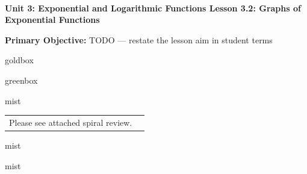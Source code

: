 \documentclass[10pt]{article}
\newcommand{\UnitNumberName}{Unit 3: Exponential and Logarithmic Functions \quad}
\newcommand{\LessonNumberName}{Lesson 3.2: Graphs of Exponential Functions}
\begin{document}
\begin{center}
    {\Large\bfseries \CourseName \\
    {\small\bfseries \UnitNumberName \LessonNumberName}}
\end{center}

\begin{tcolorbox}[colback=mist, colframe=royal, boxrule=0.9pt, arc=2mm,
    left=2mm, right=2mm, top=1.5mm, bottom=1.5mm]
    \textbf{Primary Objective:} TODO --- restate the lesson aim in student terms
\end{tcolorbox}

\renewcommand{\arraystretch}{1.6}
\begin{skillbox}{goldbox}
\end{skillbox}

\begin{skillbox}{greenbox}
\end{skillbox}

\begin{fixedskillbox}{mist}
    \begin{tabularx}{\linewidth}{@{}X c@{}}
        \begin{minipage}[t]{0.55\linewidth}\vspace{0pt}
            Please see attached spiral review.  %
        \end{minipage}
        &
        \begin{minipage}[t]{0.38\linewidth}\vspace{0pt}\centering
        \end{minipage}
    \end{tabularx}
\end{fixedskillbox}

\begin{skillbox}[Hook]{mist}
\end{skillbox}

\begin{skillbox}[Lesson]{mist}
\end{skillbox}
\end{document}
